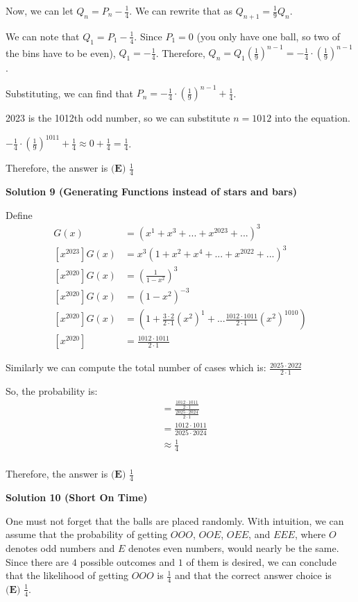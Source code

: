 \begin{enumerate}
 
Now, we can let $Q_n=P_n-\frac{1}{4}$. We can rewrite that as $Q_{n+1}=\frac{1}{9}Q_n$.

 We can note that $Q_1=P_1-\frac{1}{4}$. Since $P_1=0$ (you only have one ball, so two of the bins have to be even), $Q_1=-\frac{1}{4}$. Therefore, $Q_n=Q_1(\frac{1}{9})^{n-1}=-\frac{1}{4} \cdot (\frac{1}{9})^{n-1}$.

 Substituting, we can find that $P_n=-\frac{1}{4} \cdot (\frac{1}{9})^{n-1}+\frac{1}{4}$.

 2023 is the 1012th odd number, so we can substitute $n=1012$ into the equation.

 $-\frac{1}{4} \cdot (\frac{1}{9})^{1011}+\frac{1}{4} \approx 0+\frac{1}{4}=\frac{1}{4}$.

 Therefore, the answer is $\boxed{\textbf{(E) }\frac{1}{4}}$




\textbf{Solution 9 (Generating Functions instead of stars and bars)}

Define 
 \begin{align*} [x^{2023}]G(x)&=(x^1 + x^3 + ... + x^{2023} + ...)^3 \\ [x^{2023}]G(x)&= x^3(1+x^2+x^4+...+x^{2022}+...)^3 \\ [x^{2020}]G(x)&= (\frac{1}{1-x^2})^3 \\ [x^{2020}]G(x)&= (1-x^2)^{-3} \\ [x^{2020}]G(x)&= (1 + \frac{3 \cdot 2}{2 \cdot 1}(x^2)^1 + ... \frac{1012 \cdot 1011}{2 \cdot 1}(x^2)^{1010}) \\ [x^{2020}] &= \frac{1012 \cdot 1011}{2 \cdot 1} \end{align*}


 Similarly we can compute the total number of cases which is: $\frac{2025\cdot 2022}{2 \cdot 1}$

 So, the probability is: 
 \begin{align*} &= \frac {\frac{1012 \cdot 1011}{2 \cdot 1}}{\frac{2025\cdot 2024}{2 \cdot 1}} \\ &= \frac{1012 \cdot 1011}{2025 \cdot 2024} \\ &\approx \frac{1}{4} \\ \end{align*}


 Therefore, the answer is $\boxed{\textbf{(E) }\frac{1}{4}}$




\textbf{Solution 10 (Short On Time)}

One must not forget that the balls are placed randomly. With intuition, we can assume that the probability of getting $OOO$, $OOE$, $OEE$, and $EEE$, where $O$ denotes odd numbers and $E$ denotes even numbers, would nearly be the same. Since there are $4$ possible outcomes and $1$ of them is desired, we can conclude that the likelihood of getting $OOO$ is $\frac{1}{4}$ and that the correct answer choice is $\boxed{\textbf{(E) }\frac{1}{4}}$.


\end{enumerate}
